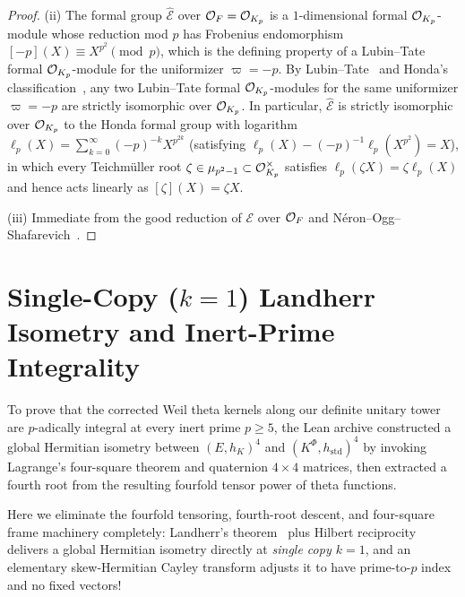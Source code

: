 \begin{proof}
(ii) The formal group $\widehat{\mathcal{E}}$ over $\mathcal{O}_F = \mathcal{O}_{K_p}$ is a $1$-dimensional formal $\mathcal{O}_{K_p}$-module whose reduction mod $p$ has Frobenius endomorphism $[-p](X) \equiv X^{p^2} \pmod{p}$, which is the defining property of a Lubin--Tate formal $\mathcal{O}_{K_p}$-module for the uniformizer $\varpi = -p$. By Lubin--Tate~\cite[Theorem~1]{LubinTate1965} and Honda's classification~\cite[Theorem~8]{Honda1970}, any two Lubin--Tate formal $\mathcal{O}_{K_p}$-modules for the same uniformizer $\varpi = -p$ are strictly isomorphic over $\mathcal{O}_{K_p}$. In particular, $\widehat{\mathcal{E}}$ is strictly isomorphic over $\mathcal{O}_{K_p}$ to the Honda formal group with logarithm $\ell_p(X) = \sum_{k=0}^\infty (-p)^{-k} X^{p^{2k}}$ (satisfying $\ell_p(X) - (-p)^{-1}\ell_p(X^{p^2}) = X$), in which every Teichm\"uller root $\zeta \in \mu_{p^2 - 1} \subset \mathcal{O}_{K_p}^\times$ satisfies $\ell_p(\zeta X) = \zeta \ell_p(X)$ and hence acts linearly as $[\zeta](X) = \zeta X$.

(iii) Immediate from the good reduction of $\mathcal{E}$ over $\mathcal{O}_F$ and N\'eron--Ogg--Shafarevich~\cite{SerreTate1968}.
\end{proof}

\section{Single-Copy ($k = 1$) Landherr Isometry and Inert-Prime Integrality}
\label{sec:07:landherr-inert}

To prove that the corrected Weil theta kernels along our definite unitary tower are $p$-adically integral at every inert prime $p \ge 5$, the Lean archive constructed a global Hermitian isometry between $(E, h_K)^4$ and $(K^{\Phi}, h_{\mathrm{std}})^4$ by invoking Lagrange's four-square theorem and quaternion $4 \times 4$ matrices, then extracted a fourth root from the resulting fourfold tensor power of theta functions.

Here we eliminate the fourfold tensoring, fourth-root descent, and four-square frame machinery completely: Landherr's theorem~\cite{Landherr1936} plus Hilbert reciprocity delivers a global Hermitian isometry directly at \emph{single copy $k = 1$}, and an elementary skew-Hermitian Cayley transform adjusts it to have prime-to-$p$ index and no fixed vectors!


